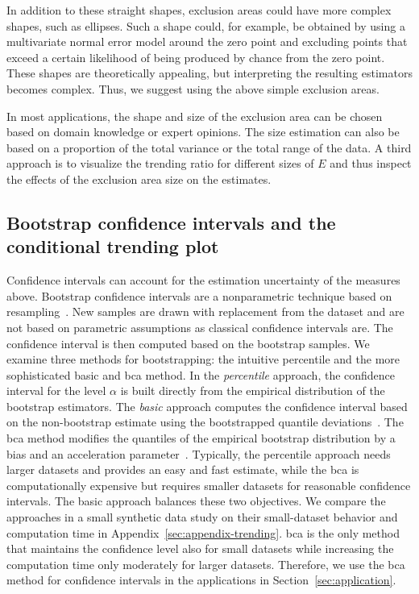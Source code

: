 In addition to these straight shapes, exclusion areas could have more complex shapes, such as ellipses.
Such a shape could, for example, be obtained by using a multivariate normal error model around the zero point and excluding points that exceed a certain likelihood of being produced by chance from the zero point.
These shapes are theoretically appealing, but interpreting the resulting estimators becomes complex.
Thus, we suggest using the above simple exclusion areas.

In most applications, the shape and size of the exclusion area can be chosen based on domain knowledge or expert opinions.
The size estimation can also be based on a proportion of the total variance or the total range of the data.
A third approach is to visualize the trending ratio for different sizes of $E$ and thus inspect the effects of the exclusion area size on the estimates.


\subsection{Bootstrap confidence intervals and the conditional trending plot}\label{subsec:trending-cond-prob}
Confidence intervals can account for the estimation uncertainty of the measures above.
Bootstrap confidence intervals are a nonparametric technique based on resampling~\parencite[for introductions see][]{Hesterberg2011,Bittmann2021}.
New samples are drawn with replacement from the dataset and are not based on parametric assumptions as classical confidence intervals are.
The confidence interval is then computed based on the bootstrap samples.
We examine three methods for bootstrapping: the intuitive percentile and the more sophisticated basic and \ac{bca} method.
In the \textit{percentile} approach, the confidence interval for the level $\alpha$ is built directly from the empirical distribution of the bootstrap estimators.
The \textit{basic} approach computes the confidence interval based on the non-bootstrap estimate using the bootstrapped quantile deviations~\parencite{Davison1997}.
The \ac{bca} method modifies the quantiles of the empirical bootstrap distribution by a bias and an acceleration parameter~\parencite{Efron1987}.
Typically, the percentile approach needs larger datasets and provides an easy and fast estimate, while the \ac{bca} is computationally expensive but requires smaller datasets for reasonable confidence intervals.
The basic approach balances these two objectives.
We compare the approaches in a small synthetic data study on their small-dataset behavior and computation time in Appendix~\ref{sec:appendix-trending}.
\Ac{bca} is the only method that maintains the confidence level also for small datasets while increasing the computation time only moderately for larger datasets.
Therefore, we use the \ac{bca} method for confidence intervals in the applications in Section~\ref{sec:application}.

